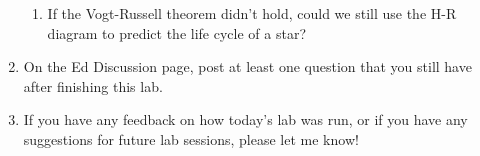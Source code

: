 \documentclass[11pt]{article}
\begin{document}
\begin{enumerate}
\begin{enumerate}
        \item If the Vogt-Russell theorem didn't hold, could we still use the H-R diagram to predict the life cycle of a star?
    \end{enumerate}
    
    \item On the Ed Discussion page, post at least one question that you still have after finishing this lab.
    
    \item If you have any feedback on how today's lab was run, or if you have any suggestions for future lab sessions, please let me know!
    
    
\end{enumerate}
\end{document}
